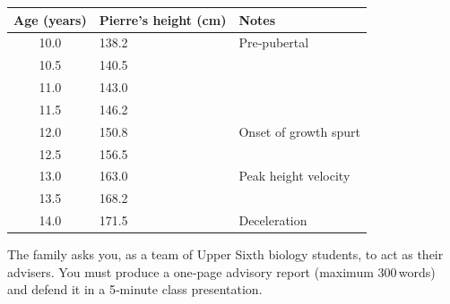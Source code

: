 \documentclass[11pt]{article}
\begin{document}
\begin{experience}
\begin{center}
\begin{tabularx}{\linewidth}{|c|X|X|}\hline
\textbf{Age (years)} & \textbf{Pierre’s height (cm)} & \textbf{Notes} \\ \hline
10.0 & 138.2 & Pre‑pubertal \\
10.5 & 140.5 & \\
11.0 & 143.0 & \\
11.5 & 146.2 & \\
12.0 & 150.8 & Onset of growth spurt \\
12.5 & 156.5 & \\
13.0 & 163.0 & Peak height velocity \\
13.5 & 168.2 & \\
14.0 & 171.5 & Deceleration \\ \hline
\end{tabularx}
\end{center}

The family asks you, as a team of Upper Sixth biology students, to act as their advisers. You must produce a one‑page advisory report (maximum 300 words) and defend it in a 5‑minute class presentation.
\end{experience}
\end{document}
